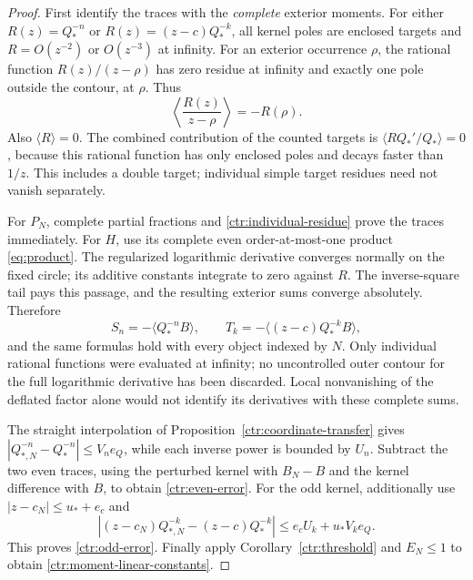 \begin{proof}
First identify the traces with the \emph{complete} exterior moments.
For either $R(z)=Q_*^{-n}$ or $R(z)=(z-c)Q_*^{-k}$, all kernel poles
are enclosed targets and $R=O(z^{-2})$ or $O(z^{-3})$ at infinity.
For an exterior occurrence $\rho$, the rational function
$R(z)/(z-\rho)$ has zero residue at infinity and exactly one pole
outside the contour, at $\rho$. Thus
\begin{equation}
 \left\langle\frac{R(z)}{z-\rho}\right\rangle=-R(\rho).
 \label{ctr:individual-residue}
\end{equation}
Also $\langle R\rangle=0$. The combined contribution of the counted
targets is $\langle RQ_*'/Q_*\rangle=0$, because this rational
function has only enclosed poles and decays faster than $1/z$.
This includes a double target; individual simple target residues need
not vanish separately.

For $P_N$, complete partial fractions and
\eqref{ctr:individual-residue} prove the traces immediately.
For $H$, use its complete even order-at-most-one product
\eqref{eq:product}. The regularized logarithmic derivative converges
normally on the fixed circle; its additive constants integrate to zero
against $R$. The inverse-square tail pays this passage, and the
resulting exterior sums converge absolutely. Therefore
\begin{equation}
 S_n=-\langle Q_*^{-n}B\rangle,\qquad
 T_k=-\langle(z-c)Q_*^{-k}B\rangle,
 \label{ctr:complete-traces}
\end{equation}
and the same formulas hold with every object indexed by $N$.
Only individual rational functions were evaluated at infinity; no
uncontrolled outer contour for the full logarithmic derivative has
been discarded. Local nonvanishing of the deflated factor alone would
not identify its derivatives with these complete sums.

The straight interpolation of Proposition~\ref{ctr:coordinate-transfer}
gives
$|Q_{*,N}^{-n}-Q_*^{-n}|\le V_ne_Q$, while each inverse power is
bounded by $U_n$. Subtract the two even traces, using the perturbed
kernel with $B_N-B$ and the kernel difference with $B$, to obtain
\eqref{ctr:even-error}. For the odd kernel, additionally use
$|z-c_N|\le u_*+e_c$ and
\[
 |(z-c_N)Q_{*,N}^{-k}-(z-c)Q_*^{-k}|
       \le e_cU_k+u_*V_ke_Q.
\]
This proves \eqref{ctr:odd-error}. Finally apply
Corollary~\ref{ctr:threshold} and $E_N\le1$ to obtain
\eqref{ctr:moment-linear-constants}.
\end{proof}

